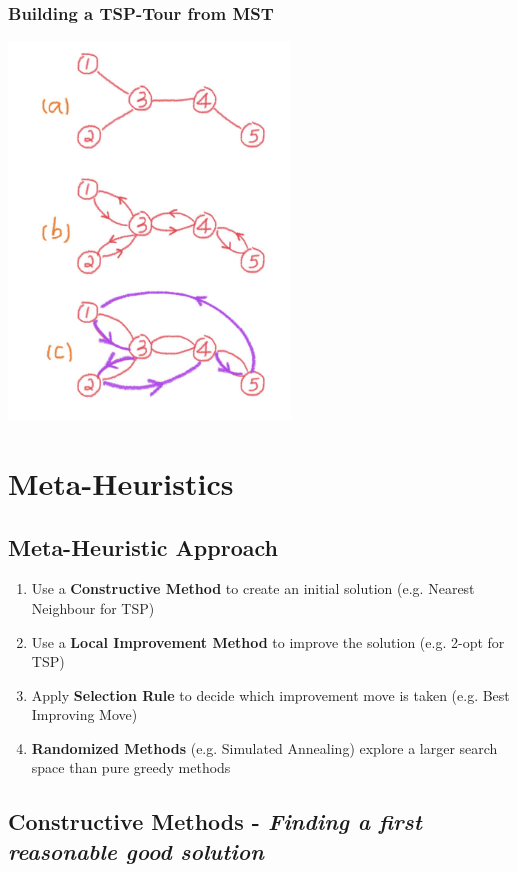 \documentclass[10pt,a4paper,twocolumn]{article}
\begin{document}
\subsubsection{Building a TSP-Tour from MST}
\begin{center}
	\includegraphics[width=7.5cm]{images/mst_for_tsp}
\end{center}


\newpage
\section{Meta-Heuristics}
\subsection{Meta-Heuristic Approach}

\begin{enumerate}
	\item Use a \textbf{Constructive Method} to create an initial solution (e.g. Nearest Neighbour for TSP)
	\item Use a \textbf{Local Improvement Method} to improve the solution (e.g. 2-opt for TSP)
	\item Apply \textbf{Selection Rule} to decide which improvement move is taken (e.g. Best Improving Move)
	\item \textbf{Randomized Methods} (e.g. Simulated Annealing) explore a larger search space than pure greedy methods
\end{enumerate}

\subsection{Constructive Methods - \textit{Finding a first reasonable good solution}}
\end{document}

